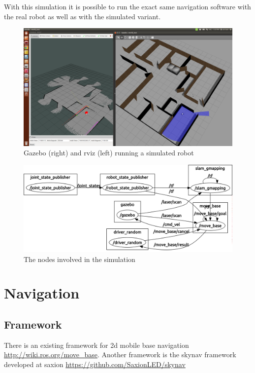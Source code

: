 \documentclass[a4paper]{article}
\begin{document}
With this simulation it is possible to run the exact same navigation software with the real
robot as well as with the simulated variant.

\begin{figure}[h!]
  \centering
  \includegraphics[width=\textwidth,height=\textheight,keepaspectratio]{img/office_sim_testgmapping.png}
  \caption{Gazebo (right) and rviz (left) running a simulated robot}
\end{figure}

\begin{figure}[h!]
  \includegraphics[width=\textwidth,height=\textheight,keepaspectratio]{img/simulatie_nodes.png}
  \caption{The nodes involved in the simulation}
\end{figure}

\section{Navigation}

\subsection{Framework}

There is an existing framework for 2d mobile base navigation \url{http://wiki.ros.org/move_base}.
Another framework is the skynav framework developed at saxion \url{https://github.com/SaxionLED/skynav}
\end{document}
